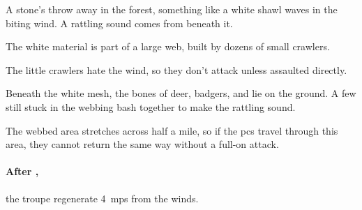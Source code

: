 \begin{boxtext}
  A stone's throw away in the forest, something like a white shawl waves in the
  biting wind.  A rattling sound comes from beneath it.
\end{boxtext}

The white material is part of a large web, built by dozens of small \glspl{crawler}.

The little \glspl{crawler} hate the wind, so they don't attack unless assaulted
directly.

\begin{boxtext}
  Beneath the white mesh, the bones of deer, badgers, and  lie on
  the ground.  A few still stuck in the webbing bash together to make the
  rattling sound.
\end{boxtext}

The webbed area stretches across half a mile, so if the \glspl{pc} travel
through this area, they cannot return the same way without a full-on attack.

\paragraph{After ,}
the troupe regenerate 4~\glspl{mp} from the winds.

\crawlerSwarm

\crawlerSwarm

\crawlerSwarm

